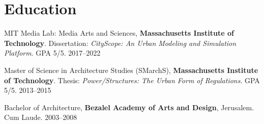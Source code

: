 \section*{Education}

\begin{tablist}

    \item[Ph.D.] \tab MIT Media Lab: Media Arts and Sciences, \textbf{Massachusetts Institute of Technology}. Dissertation: \textit{CityScope: An Urban Modeling and Simulation Platform}. GPA 5/5. 2017--2022
    \item[M.S.] \tab Master of Science in Architecture Studies (SMarchS), \textbf{Massachusetts Institute of Technology}. Thesis: \textit{Power/Structures: The Urban Form of Regulations}. GPA 5/5. 2013--2015
    \item[B.Arch.] \tab Bachelor of Architecture, \textbf{Bezalel Academy of Arts and Design}, Jerusalem. Cum Laude. 2003--2008

\end{tablist}
